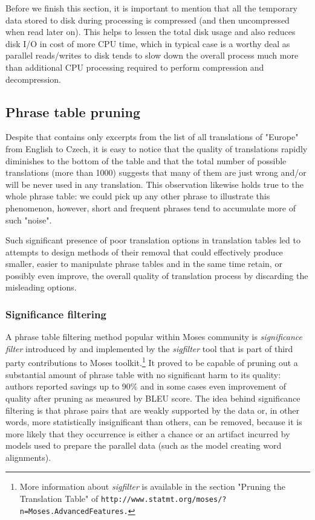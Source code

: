 Before we finish this section, it is important to mention that all
the temporary data stored to disk during processing is compressed
(and then uncompressed when read later on).
This helps to lessen the total disk usage and also reduces disk I/O in cost of
more CPU time, which in typical case is a worthy deal as parallel reads/writes
to disk tends to slow down the overall process much more than additional
CPU processing required to perform compression and decompression.

\subsection{Phrase table pruning}

Despite that  contains only excerpts from the list
of all translations of "Europe" from English to Czech, it is easy to notice
that the quality of translations rapidly diminishes to the bottom of the table
and that the total number of possible translations (more than 1000) suggests
that many of them are just wrong and/or will be never used in any translation.
This observation likewise holds true to the whole phrase table: we could pick up
any other phrase to illustrate this phenomenon, however, short and frequent
phrases tend to accumulate more of such "noise".

Such significant presence of poor translation options in translation tables led to
attempts to design methods of their removal that could effectively produce smaller,
easier to manipulate phrase tables and in the same time retain, or possibly even improve,
the overall quality of translation process by discarding the misleading options.

\subsubsection*{Significance filtering}
\label{sec:significance-filtering}

A phrase table filtering method popular within Moses community is \emph{significance filter}
introduced by \citet{johnson:sigfilter} and implemented by the \emph{sigfilter} tool
that is part of third party contributions to Moses toolkit.\footnote{More information
about \emph{sigfilter} is available in the section "Pruning the Translation Table" of
\tt{http://www.statmt.org/moses/?n=Moses.AdvancedFeatures}.}
It proved to be capable of pruning out a substantial amount of phrase table with no
significant harm to its quality: authors reported savings up to 90\% and in some cases
even improvement of quality after pruning as measured by BLEU score.
The idea behind significance filtering is that phrase pairs that are weakly supported
by the data or, in other words, more statistically insignificant than others, can be
removed, because it is more likely that they occurrence is either a chance or an artifact
incurred by models used to prepare the parallel data (such as the model creating word
alignments).

